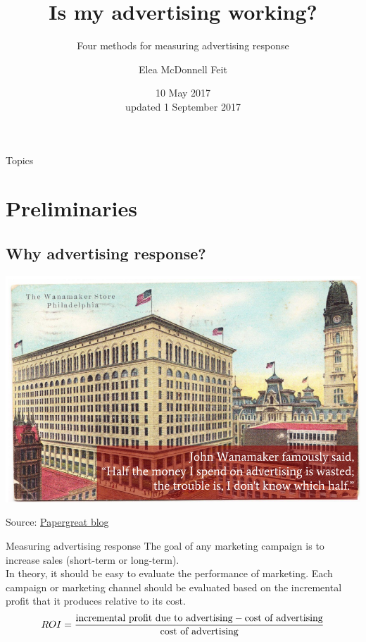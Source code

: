 \documentclass[10pt, aspectratio=169]{beamer}
\title{Is my advertising working?}
\subtitle{Four methods for measuring advertising response}
\date{10 May 2017 \\ updated 1 September 2017} %
\author{Elea McDonnell Feit}
\newcommand{\source}[1]{\begin{flushright} \footnotesize Source: {#1} \end{flushright} \normalsize}
\begin{document}
%

\maketitle

\begin{frame}{Topics}
\tableofcontents[hideallsubsections]
\end{frame}


\section{Preliminaries}

\subsection{Why advertising response?}

\begin{frame}{}
\centering
\includegraphics[height=\textheight]{images/WanamakerQuote.png}
\source{\href{http://www.papergreat.com/2012/09/saturdays-postcard-wanamakers-and-1911.html}{Papergreat blog}}
\end{frame}

\begin{frame}{Measuring advertising response}
The goal of any marketing campaign is to increase sales (short-term or long-term). \\
\bigskip \pause
In theory, it should be easy to evaluate the performance of marketing.  Each campaign or marketing channel should be evaluated based on the \alert{incremental profit} that it produces relative to its \alert{cost}. \\
\bigskip
\begin{equation*}
ROI = \frac{\textnormal{incremental profit due to advertising} - \textnormal{cost of advertising}}{\textnormal{cost of advertising}}
\end{equation*}
\end{frame}
\end{document}
